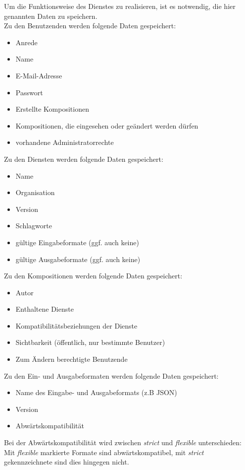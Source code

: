 Um die Funktionsweise des Dienstes zu realisieren, ist es notwendig, die hier genannten Daten zu speichern.\\
Zu den Benutzenden werden folgende Daten gespeichert:
\begin{itemize}
	\item Anrede
	\item Name
	\item E-Mail-Adresse
	\item Passwort
	\item Erstellte Kompositionen
	\item Kompositionen, die eingesehen oder geändert werden dürfen
	\item vorhandene Administratorrechte
\end{itemize}
Zu den Diensten werden folgende Daten gespeichert:
\begin{itemize}
	\item Name
	\item Organisation
	\item Version
	\item Schlagworte
	\item gültige Eingabeformate (ggf. auch keine)
	\item gültige Ausgabeformate (ggf. auch keine)
\end{itemize}
Zu den Kompositionen werden folgende Daten gespeichert:
\begin{itemize}
	\item Autor
	\item Enthaltene Dienste
	\item Kompatibilitätsbeziehungen der Dienste
	\item Sichtbarkeit (öffentlich, nur bestimmte Benutzer)
	\item Zum Ändern berechtigte Benutzende
\end{itemize}

Zu den Ein- und Ausgabeformaten werden folgende Daten gespeichert:
\begin{itemize}
	\item Name des Eingabe- und Ausgabeformats (z.B JSON)
	\item Version
	\item Abwärtskompatibilität\\
\end{itemize}
Bei der Abwärtskompatibilität wird zwischen \textit{strict} und \textit{flexible} unterschieden: Mit \textit{flexible} markierte Formate sind abwärtskompatibel, mit \textit{strict} gekennzeichnete sind dies hingegen nicht.
